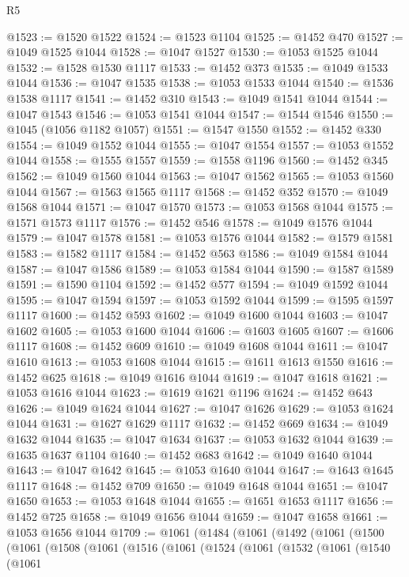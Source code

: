 \begin{lexlean}{R5}
\begin{coremodule}
@1523 := @1520 @1522
@1524 := @1523 @1104
@1525 := @1452 @470
@1527 := @1049 @1525 @1044
@1528 := @1047 @1527
@1530 := @1053 @1525 @1044
@1532 := @1528 @1530 @1117
@1533 := @1452 @373
@1535 := @1049 @1533 @1044
@1536 := @1047 @1535
@1538 := @1053 @1533 @1044
@1540 := @1536 @1538 @1117
@1541 := @1452 @310
@1543 := @1049 @1541 @1044
@1544 := @1047 @1543
@1546 := @1053 @1541 @1044
@1547 := @1544 @1546
@1550 := @1045 (@1056 @1182 @1057)
@1551 := @1547 @1550
@1552 := @1452 @330
@1554 := @1049 @1552 @1044
@1555 := @1047 @1554
@1557 := @1053 @1552 @1044
@1558 := @1555 @1557
@1559 := @1558 @1196
@1560 := @1452 @345
@1562 := @1049 @1560 @1044
@1563 := @1047 @1562
@1565 := @1053 @1560 @1044
@1567 := @1563 @1565 @1117
@1568 := @1452 @352
@1570 := @1049 @1568 @1044
@1571 := @1047 @1570
@1573 := @1053 @1568 @1044
@1575 := @1571 @1573 @1117
@1576 := @1452 @546
@1578 := @1049 @1576 @1044
@1579 := @1047 @1578
@1581 := @1053 @1576 @1044
@1582 := @1579 @1581
@1583 := @1582 @1117
@1584 := @1452 @563
@1586 := @1049 @1584 @1044
@1587 := @1047 @1586
@1589 := @1053 @1584 @1044
@1590 := @1587 @1589
@1591 := @1590 @1104
@1592 := @1452 @577
@1594 := @1049 @1592 @1044
@1595 := @1047 @1594
@1597 := @1053 @1592 @1044
@1599 := @1595 @1597 @1117
@1600 := @1452 @593
@1602 := @1049 @1600 @1044
@1603 := @1047 @1602
@1605 := @1053 @1600 @1044
@1606 := @1603 @1605
@1607 := @1606 @1117
@1608 := @1452 @609
@1610 := @1049 @1608 @1044
@1611 := @1047 @1610
@1613 := @1053 @1608 @1044
@1615 := @1611 @1613 @1550
@1616 := @1452 @625
@1618 := @1049 @1616 @1044
@1619 := @1047 @1618
@1621 := @1053 @1616 @1044
@1623 := @1619 @1621 @1196
@1624 := @1452 @643
@1626 := @1049 @1624 @1044
@1627 := @1047 @1626
@1629 := @1053 @1624 @1044
@1631 := @1627 @1629 @1117
@1632 := @1452 @669
@1634 := @1049 @1632 @1044
@1635 := @1047 @1634
@1637 := @1053 @1632 @1044
@1639 := @1635 @1637 @1104
@1640 := @1452 @683
@1642 := @1049 @1640 @1044
@1643 := @1047 @1642
@1645 := @1053 @1640 @1044
@1647 := @1643 @1645 @1117
@1648 := @1452 @709
@1650 := @1049 @1648 @1044
@1651 := @1047 @1650
@1653 := @1053 @1648 @1044
@1655 := @1651 @1653 @1117
@1656 := @1452 @725
@1658 := @1049 @1656 @1044
@1659 := @1047 @1658
@1661 := @1053 @1656 @1044
@1709 := @1061
    (@1484
      (@1061
        (@1492
          (@1061
            (@1500
              (@1061
                (@1508
                  (@1061
                    (@1516
                      (@1061
                        (@1524
                          (@1061
                            (@1532
                              (@1061
                                (@1540
                                  (@1061

\end{coremodule}
\end{lexlean}
